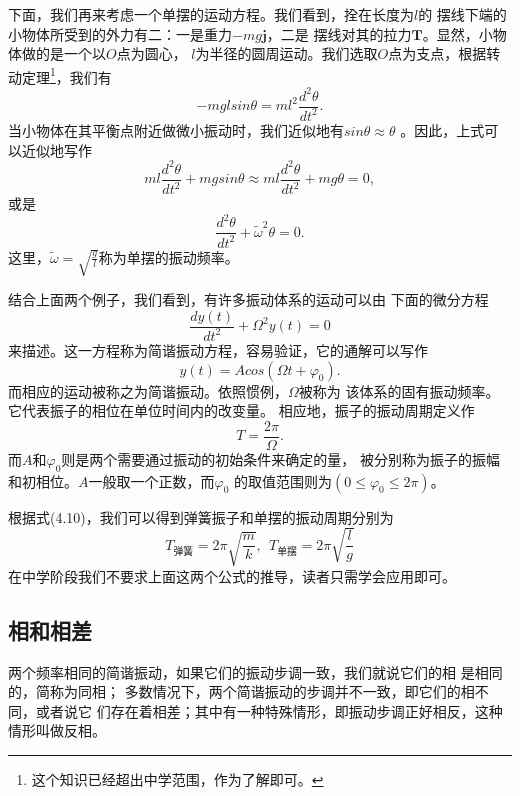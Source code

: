 下面，我们再来考虑一个单摆的运动方程。我们看到，拴在长度为$l$的 
摆线下端的小物体所受到的外力有二：一是重力$-mg\boldsymbol{j}$，二是
摆线对其的拉力$\boldsymbol{T}$。显然，小物体做的是一个以$O$点为圆心，
$l$为半径的圆周运动。我们选取$O$点为支点，根据转动定理\footnote{
    这个知识已经超出中学范围，作为了解即可。
}，我们有 
\begin{equation}
    -mglsin\theta =ml^2\frac{d^2\theta }{dt^2 }.
\end{equation}
当小物体在其平衡点附近做微小振动时，我们近似地有$sin\theta\approx \theta $
。因此，上式可以近似地写作
\begin{equation}
    ml\frac{d^2\theta }{dt^2 }+mgsin\theta\approx
    ml\frac{d^2\theta }{dt^2 }+mg\theta=0,
\end{equation}
或是
\begin{equation}
    \frac{d^2\theta }{dt^2 }+\tilde{\omega}^2\theta =0.
\end{equation}
这里，$\tilde{\omega}=\sqrt{\frac{g}{l}}$称为单摆的振动频率。

结合上面两个例子，我们看到，有许多振动体系的运动可以由
下面的微分方程
\begin{equation}
    \frac{dy(t)}{dt^2}+\Omega^2y(t)=0
\end{equation}
来描述。这一方程称为简谐振动方程，容易验证，它的通解可以写作
\begin{equation}
    y(t)=Acos(\Omega t+\varphi_0).
\end{equation}
而相应的运动被称之为简谐振动。依照惯例，$\Omega$被称为 
该体系的固有振动频率。它代表振子的相位在单位时间内的改变量。
相应地，振子的振动周期定义作
\begin{equation}
    T=\frac{2\pi}{\Omega}.
\end{equation}
而$A$和$\varphi_0$则是两个需要通过振动的初始条件来确定的量，
被分别称为振子的振幅和初相位。$A$一般取一个正数，而$\varphi_0$
的取值范围则为$(0\leqslant \varphi_0\leqslant 2\pi)$。

根据式(4.10)，我们可以得到弹簧振子和单摆的振动周期分别为
\begin{equation}
    T_{\text{弹簧}}=2\pi\sqrt{\frac{m}{k}},~~T_{\text{单摆}}=2\pi\sqrt{\frac{l}{g}}
\end{equation}
在中学阶段我们不要求上面这两个公式的推导，读者只需学会应用即可。
\subsection{相和相差}
\begin{definition}
    两个频率相同的简谐振动，如果它们的振动步调一致，我们就说它们的相
    是相同的，简称为同相；
    多数情况下，两个简谐振动的步调并不一致，即它们的相不同，或者说它
    们存在着相差；其中有一种特殊情形，即振动步调正好相反，这种情形叫做反相。
\end{definition}

